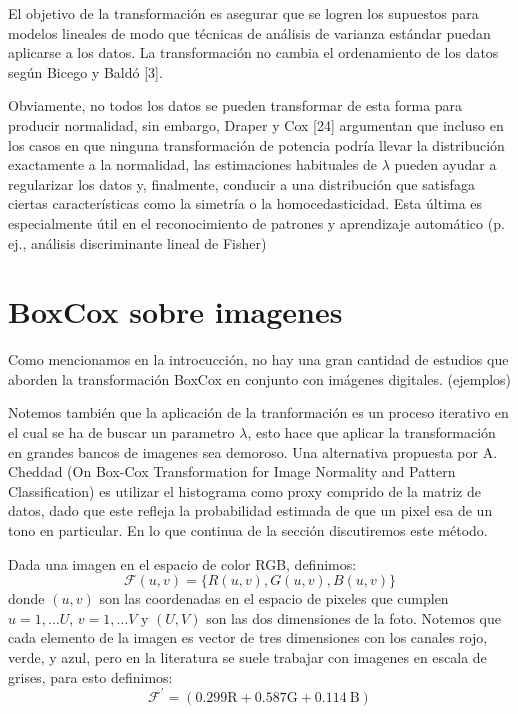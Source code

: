     El objetivo de la transformaci\'on es asegurar que se logren los supuestos para modelos lineales de modo que t\'ecnicas de an\'alisis de varianza est\'andar puedan aplicarse a los datos. La transformaci\'on no cambia el ordenamiento de los datos seg\'un Bicego y Bald\'o [3].

    Obviamente, no todos los datos se pueden transformar de esta forma para producir normalidad, sin embargo, Draper y Cox [24] argumentan que incluso en los casos en que ninguna transformaci\'on de potencia podr\'ia llevar la distribuci\'on exactamente a la normalidad, las estimaciones habituales de $\lambda$ pueden ayudar a regularizar los datos y, finalmente, conducir a una distribuci\'on que satisfaga ciertas caracter\'isticas como la simetr\'ia o la homocedasticidad. Esta \'ultima es especialmente \'util en el reconocimiento de patrones y aprendizaje automático (p. ej., an\'alisis discriminante lineal de Fisher)



    \section[]{BoxCox sobre imagenes} 

    Como mencionamos en la introcucci\'on, no hay una gran cantidad de estudios que aborden la transformaci\'on BoxCox en conjunto con imágenes digitales. (ejemplos)


    Notemos tambi\'en que la aplicaci\'on de la tranformaci\'on es un proceso iterativo en el cual se ha de buscar un parametro $\lambda$, esto hace que aplicar la transformaci\'on en grandes bancos de imagenes sea demoroso. Una alternativa propuesta por A. Cheddad (On Box-Cox Transformation for Image Normality and Pattern Classification) es utilizar el histograma como proxy comprido de la matriz de datos, dado que este refleja la probabilidad estimada de que un pixel esa de un tono en particular. En lo que continua de la secci\'on discutiremos este m\'etodo.

    Dada una imagen en el espacio de color RGB, definimos:
    $$
    \mathcal{F}(u, v)=\{R(u, v), G(u, v), B(u, v)\}
    $$
    donde $(u, v)$ son las coordenadas en el espacio de pixeles que cumplen $u=1, \ldots U$, $v=1, \ldots V$ y $(U, V)$ son las dos dimensiones de la foto. Notemos que cada elemento de la imagen es vector de tres dimensiones con los canales rojo, verde, y azul, pero en la literatura se suele trabajar con imagenes en escala de grises, para esto definimos:
    $$
    \mathcal{F}^{\prime} =(0.299 \mathrm{R}+0.587 \mathrm{G}+0.114 \mathrm{~B})
    $$


